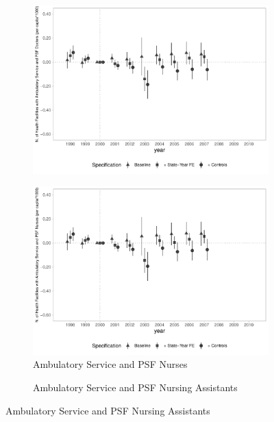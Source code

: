 \begin{figure}[h]
\begin{center}
\begin{subfigure}{0.24\textwidth}
        \includegraphics[width=\textwidth]{plots/infra/sia_ncnes_medpsf_pcapita_dist_ec29_baseline_dist_ec29_baseline_full.pdf}
    \end{subfigure}
    \begin{subfigure}{0.24\textwidth}
        \centering
        \caption{\tiny Ambulatory Service and PSF Nurses}\label{fig:infra_l}
        \includegraphics[width=\textwidth]{plots/infra/sia_ncnes_enfpsf_pcapita_dist_ec29_baseline_dist_ec29_baseline_full.pdf}
    \end{subfigure}
    \begin{subfigure}{0.24\textwidth}
        \centering
        \caption{\tiny Ambulatory Service and PSF Nursing Assistants}\label{fig:infra_m}

\end{subfigure}
\end{center}
\end{figure}
